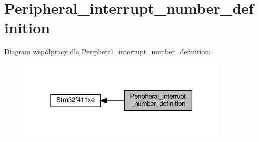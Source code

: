\hypertarget{group___peripheral__interrupt__number__definition}{}\section{Peripheral\+\_\+interrupt\+\_\+number\+\_\+definition}
\label{group___peripheral__interrupt__number__definition}
Diagram współpracy dla Peripheral\+\_\+interrupt\+\_\+number\+\_\+definition\+:\nopagebreak
\begin{figure}[H]
\begin{center}
\leavevmode
\includegraphics[width=291pt]{group___peripheral__interrupt__number__definition}
\end{center}
\end{figure}
